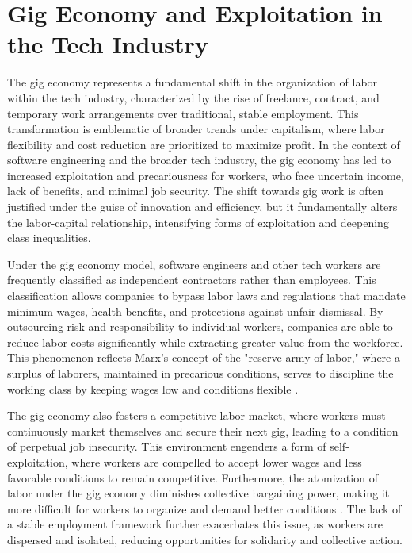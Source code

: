 \section{Gig Economy and Exploitation in the Tech Industry}

The gig economy represents a fundamental shift in the organization of labor within the tech industry, characterized by the rise of freelance, contract, and temporary work arrangements over traditional, stable employment. This transformation is emblematic of broader trends under capitalism, where labor flexibility and cost reduction are prioritized to maximize profit. In the context of software engineering and the broader tech industry, the gig economy has led to increased exploitation and precariousness for workers, who face uncertain income, lack of benefits, and minimal job security. The shift towards gig work is often justified under the guise of innovation and efficiency, but it fundamentally alters the labor-capital relationship, intensifying forms of exploitation and deepening class inequalities.

Under the gig economy model, software engineers and other tech workers are frequently classified as independent contractors rather than employees. This classification allows companies to bypass labor laws and regulations that mandate minimum wages, health benefits, and protections against unfair dismissal. By outsourcing risk and responsibility to individual workers, companies are able to reduce labor costs significantly while extracting greater value from the workforce. This phenomenon reflects Marx's concept of the "reserve army of labor," where a surplus of laborers, maintained in precarious conditions, serves to discipline the working class by keeping wages low and conditions flexible \cite[pp.~781-783]{marx1867capital}.

The gig economy also fosters a competitive labor market, where workers must continuously market themselves and secure their next gig, leading to a condition of perpetual job insecurity. This environment engenders a form of self-exploitation, where workers are compelled to accept lower wages and less favorable conditions to remain competitive. Furthermore, the atomization of labor under the gig economy diminishes collective bargaining power, making it more difficult for workers to organize and demand better conditions \cite[pp.~143-145]{fuchs2014digital}. The lack of a stable employment framework further exacerbates this issue, as workers are dispersed and isolated, reducing opportunities for solidarity and collective action.

